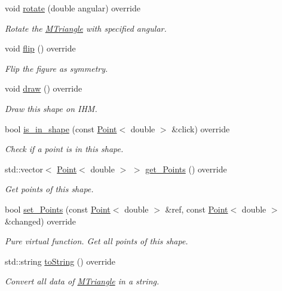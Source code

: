 \begin{DoxyCompactItemize}
void \hyperlink{classMTriangle_a4be29553eeddf99c367b1ec220bc102b}{rotate} (double angular) override
\begin{DoxyCompactList}\small\item\em Rotate the \hyperlink{classMTriangle}{M\+Triangle} with specified angular. \end{DoxyCompactList}\item 
\mbox{\label{classMTriangle_a6258b96b57c1892098f84a5a5fa0f976}} 
void \hyperlink{classMTriangle_a6258b96b57c1892098f84a5a5fa0f976}{flip} () override
\begin{DoxyCompactList}\small\item\em Flip the figure as symmetry. \end{DoxyCompactList}\item 
\mbox{\label{classMTriangle_a7801818e2188f39ba89a2a82df8fa5fe}} 
void \hyperlink{classMTriangle_a7801818e2188f39ba89a2a82df8fa5fe}{draw} () override
\begin{DoxyCompactList}\small\item\em Draw this shape on I\+HM. \end{DoxyCompactList}\item 
bool \hyperlink{classMTriangle_a4cc4cd63537ead67a0b68d1ab25111b4}{is\+\_\+in\+\_\+shape} (const \hyperlink{classPoint}{Point}$<$ double $>$ \&click) override
\begin{DoxyCompactList}\small\item\em Check if a point is in this shape. \end{DoxyCompactList}\item 
std\+::vector$<$ \hyperlink{classPoint}{Point}$<$ double $>$ $>$ \hyperlink{classMTriangle_a90351a097a20d35f9d6c4d05ad881e48}{get\+\_\+\+Points} () override
\begin{DoxyCompactList}\small\item\em Get points of this shape. \end{DoxyCompactList}\item 
bool \hyperlink{classMTriangle_aec40d088d077bfb14f94895be871dfdf}{set\+\_\+\+Points} (const \hyperlink{classPoint}{Point}$<$ double $>$ \&ref, const \hyperlink{classPoint}{Point}$<$ double $>$ \&changed) override
\begin{DoxyCompactList}\small\item\em Pure virtual function. Get all points of this shape. \end{DoxyCompactList}\item 
std\+::string \hyperlink{classMTriangle_a7d1fd825592dffa6ac05b3398a8c105a}{to\+String} () override
\begin{DoxyCompactList}\small\item\em Convert all data of \hyperlink{classMTriangle}{M\+Triangle} in a string. \end{DoxyCompactList}\end{DoxyCompactItemize}
